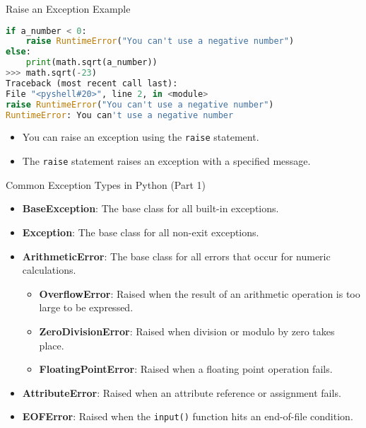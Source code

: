 \begin{frame}[fragile]{Raise an Exception Example}
    \begin{lstlisting}[style=colorful, language=Python]
if a_number < 0:
    raise RuntimeError("You can't use a negative number")
else:
    print(math.sqrt(a_number))
>>> math.sqrt(-23)
Traceback (most recent call last):
File "<pyshell#20>", line 2, in <module>
raise RuntimeError("You can't use a negative number")
RuntimeError: You can't use a negative number

    \end{lstlisting}
    \begin{itemize}
        \item You can raise an exception using the \texttt{raise} statement.
        \item The \texttt{raise} statement raises an exception with a specified message.
    \end{itemize}
\end{frame} 

\begin{frame}{Common Exception Types in Python (Part 1)}
    \begin{itemize}
        \item \textbf{BaseException}: The base class for all built-in exceptions.
        \item \textbf{Exception}: The base class for all non-exit exceptions.
        \item \textbf{ArithmeticError}: The base class for all errors that occur for numeric calculations.
            \begin{itemize}
                \item \textbf{OverflowError}: Raised when the result of an arithmetic operation is too large to be expressed.
                \item \textbf{ZeroDivisionError}: Raised when division or modulo by zero takes place.
                \item \textbf{FloatingPointError}: Raised when a floating point operation fails.
            \end{itemize}
        \item \textbf{AttributeError}: Raised when an attribute reference or assignment fails.
        \item \textbf{EOFError}: Raised when the \texttt{input()} function hits an end-of-file condition.
    \end{itemize}
\end{frame}

